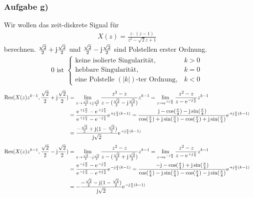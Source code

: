 \documentclass[11pt,a4paper,DIV=12]{scrartcl}
\begin{document}
\subsubsection{Aufgabe g)}
Wir wollen das zeit-diskrete Signal für
\begin{align}
	X(z)=\frac{z\cdot(z-1)}{z^2-\sqrt{2}z+1}
\end{align}
berechnen.
$\frac{\sqrt{2}}{2}+\im\frac{\sqrt{2}}{2}$ und $\frac{\sqrt{2}}{2}-\im\frac{\sqrt{2}}{2}$ sind Polstellen erster Ordnung.
\begin{align}
	0\text{ ist }\begin{cases}
		\text{keine isolierte Singularität}, &k>0 \\
		\text{hebbare Singularität}, &k=0 \\
		\text{eine Polstelle } (|k|)\text{-ter Ordnung}, &k<0
	\end{cases}
\end{align}
\begin{align}
	\mathrm{Res}(X(z)z^{k-1},\frac{\sqrt{2}}{2}+\im\frac{\sqrt{2}}{2})&=\lim\limits_{z\rightarrow\frac{\sqrt{2}}{2}+\im\frac{\sqrt{2}}{2}}\frac{z^2-z}{z-(\frac{\sqrt{2}}{2}-\im\frac{\sqrt{2}}{2})}z^{k-1}=\lim\limits_{z\rightarrow\e^{+\im\frac{\pi}{4}}}\frac{z^2-z}{z-\e^{-\im\frac{\pi}{4}}}z^{k-1}\nonumber\\
	&=\frac{\e^{+\im\frac{\pi}{2}}-\e^{+\im\frac{\pi}{4}}}{\e^{+\im\frac{\pi}{4}}-\e^{-\im\frac{\pi}{4}}}\e^{+\im\frac{\pi}{4}(k-1)}=\frac{\im-\cos(\frac{\pi}{4})-\im\sin(\frac{\pi}{4})}{\cos(\frac{\pi}{4})+\im\sin(\frac{\pi}{4})-\cos(\frac{\pi}{4})+\im\sin(\frac{\pi}{4})}\e^{+\im\frac{\pi}{4}(k-1)}\nonumber\\
	&=\frac{-\frac{\sqrt{2}}{2}+\im(1-\frac{\sqrt{2}}{2})}{\im\sqrt{2}}\e^{+\im\frac{\pi}{4}(k-1)}
\end{align}
\begin{align}
	\mathrm{Res}(X(z)z^{k-1},\frac{\sqrt{2}}{2}-\im\frac{\sqrt{2}}{2})&=\lim\limits_{z\rightarrow\frac{\sqrt{2}}{2}-\im\frac{\sqrt{2}}{2}}\frac{z^2-z}{z-(\frac{\sqrt{2}}{2}+\im\frac{\sqrt{2}}{2})}z^{k-1}=\lim\limits_{z\rightarrow\e^{-\im\frac{\pi}{4}}}\frac{z^2-z}{z-\e^{+\im\frac{\pi}{4}}}z^{k-1}\nonumber\\
	&=\frac{\e^{-\im\frac{\pi}{2}}-\e^{-\im\frac{\pi}{4}}}{\e^{-\im\frac{\pi}{4}}-\e^{+\im\frac{\pi}{4}}}\e^{-\im\frac{\pi}{4}(k-1)}=\frac{-\im-\cos(\frac{\pi}{4})+\im\sin(\frac{\pi}{4})}{\cos(\frac{\pi}{4})-\im\sin(\frac{\pi}{4})-\cos(\frac{\pi}{4})-\im\sin(\frac{\pi}{4})}\e^{+\im\frac{\pi}{4}(k-1)}\nonumber\\
	&=-\frac{-\frac{\sqrt{2}}{2}-\im(1-\frac{\sqrt{2}}{2})}{\im\sqrt{2}}\e^{-\im\frac{\pi}{4}(k-1)}
\end{align}
\end{document}
